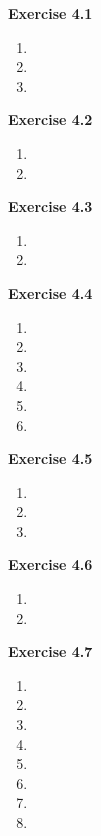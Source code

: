




\textbf{Exercise 4.1}
\begin{enumerate}
    \item 
    \item 
    \item 
\end{enumerate}

\textbf{Exercise 4.2}
\begin{enumerate}
    \item 
    \item 
\end{enumerate}

\textbf{Exercise 4.3}
\begin{enumerate}
    \item 
    \item 
\end{enumerate}

\textbf{Exercise 4.4}
\begin{enumerate}
    \item 
    \item 
    \item 
    \item 
    \item 
    \item 
\end{enumerate}

\textbf{Exercise 4.5}
\begin{enumerate}
    \item 
    \item 
    \item 
\end{enumerate}

\textbf{Exercise 4.6}
\begin{enumerate}
    \item 
    \item 
\end{enumerate}

\textbf{Exercise 4.7}
\begin{enumerate}
    \item 
    \item 
    \item 
    \item 
    \item 
    \item 
    \item 
    \item 
\end{enumerate}

